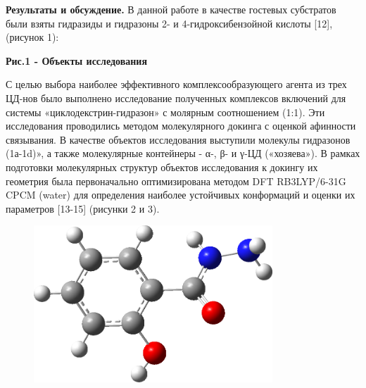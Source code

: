 {\bfseries Результаты и обсуждение.} В данной работе в качестве гостевых
субстратов были взяты гидразиды и гидразоны 2- и 4-гидроксибензойной
кислоты {[}12{]}, (рисунок 1):


{\bfseries Рис.1 - Объекты исследования}

С целью выбора наиболее эффективного комплексообразующего агента из трех
ЦД-нов было выполнено исследование полученных комплексов включений для
системы «циклодекстрин-гидразон» с молярным соотношением (1:1). Эти
исследования проводились методом молекулярного докинга с оценкой
афинности связывания. В качестве объектов исследования выступили
молекулы гидразонов (1а-1d)», а также молекулярные контейнеры -
α-, β- и γ-ЦД («хозяева»). В рамках подготовки молекулярных структур
объектов исследования к докингу их геометрия была первоначально
оптимизирована методом DFT RB3LYP/6-31G CPCM (water) для определения
наиболее устойчивых конформаций и оценки их параметров {[}13-15{]}
(рисунки 2 и 3).

\begin{figure}[H]
	\centering
	\includegraphics[width=0.8\textwidth]{media/chem2/image31}
	\caption*{}
\end{figure}

